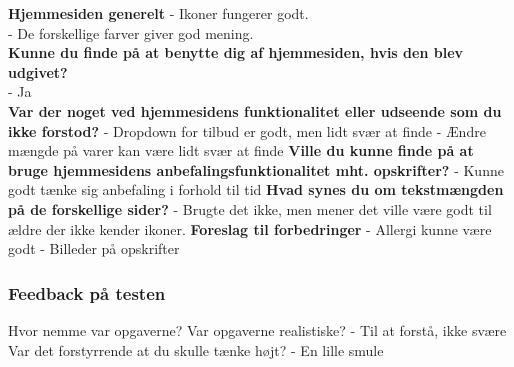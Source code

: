 \textbf{Hjemmesiden generelt}
 - Ikoner fungerer godt. \\
 - De forskellige farver giver god mening.\\
\textbf{Kunne du finde på at benytte dig af hjemmesiden, hvis den blev udgivet?}\\
 - Ja\\
\textbf{Var der noget ved hjemmesidens funktionalitet eller udseende som du ikke forstod?}
 - Dropdown for tilbud er godt, men lidt svær at finde
 - Ændre mængde på varer kan være lidt svær at finde
\textbf{Ville du kunne finde på at bruge hjemmesidens anbefalingsfunktionalitet mht. opskrifter?}
 - Kunne godt tænke sig anbefaling i forhold til tid
 \textbf{Hvad synes du om tekstmængden på de forskellige sider?}
 - Brugte det ikke, men mener det ville være godt til ældre der ikke kender ikoner.
\textbf{Foreslag til forbedringer}
 - Allergi kunne være godt
 - Billeder på opskrifter

\subsubsection{Feedback på testen}
Hvor nemme var opgaverne? Var opgaverne realistiske?
 - Til at forstå, ikke svære
Var det forstyrrende at du skulle tænke højt?
 - En lille smule



